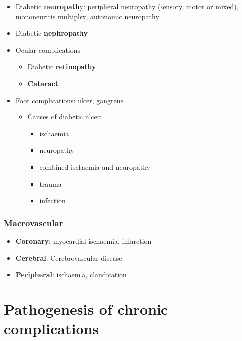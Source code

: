 \documentclass[
  12pt,
]{memoir}
\providecommand{\tightlist}{%
  \setlength{\itemsep}{0pt}\setlength{\parskip}{0pt}}
\begin{document}
\begin{itemize}
\tightlist
\item
  Diabetic \textbf{neuropathy}: peripheral neuropathy (sensory, motor or
  mixed), mononeuritis multiplex, autonomic neuropathy
\item
  Diabetic \textbf{nephropathy}
\item
  Ocular complications:

  \begin{itemize}
  \tightlist
  \item
    Diabetic \textbf{retinopathy}
  \item
    \textbf{Cataract}
  \end{itemize}
\item
  Foot complications: ulcer, gangrene

  \begin{itemize}
  \tightlist
  \item
    Causes of diabetic ulcer:

    \begin{itemize}
    \tightlist
    \item
      ischaemia
    \item
      neuropathy
    \item
      combined ischaemia and neuropathy
    \item
      trauma
    \item
      infection
    \end{itemize}
  \end{itemize}
\end{itemize}

\hypertarget{macrovascular}{%
\subsubsection{Macrovascular}\label{macrovascular}}

\begin{itemize}
\tightlist
\item
  \textbf{Coronary}: myocardial ischaemia, infarction
\item
  \textbf{Cerebral}: Cerebrovascular disease
\item
  \textbf{Peripheral}: ischaemia, claudication
\end{itemize}

\pagebreak

\hypertarget{pathogenesis-of-chronic-complications}{%
\section{Pathogenesis of chronic
complications}\label{pathogenesis-of-chronic-complications}}
\end{document}
